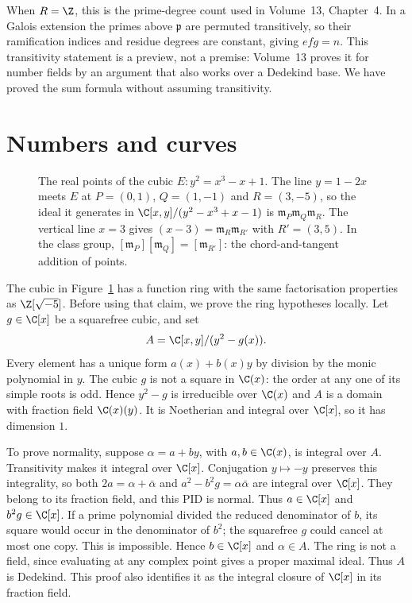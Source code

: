 When $R=\Z$, this is the prime-degree count used in Volume~13, Chapter~4. In a Galois extension the primes above $\mathfrak p$ are permuted transitively, so their ramification indices and residue degrees are constant, giving $efg=n$. This transitivity statement is a preview, not a premise: Volume~13 proves it for number fields by an argument that also works over a Dedekind base. We have proved the sum formula without assuming transitivity.

\section{Numbers and curves}

\begin{figure}[ht]
\centering
{}
\caption{The real points of the cubic $E\colon y^2=x^3-x+1$. The line $y=1-2x$ meets $E$ at $P=(0,1)$, $Q=(1,-1)$ and $R=(3,-5)$, so the ideal it generates in $\C[x,y]/(y^2-x^3+x-1)$ is $\mathfrak m_P\mathfrak m_Q\mathfrak m_R$.
The vertical line $x=3$ gives $(x-3)=\mathfrak m_R\mathfrak m_{R'}$ with $R'=(3,5)$. In the class group, $[\mathfrak m_P][\mathfrak m_Q]=[\mathfrak m_{R'}]$: the chord-and-tangent addition of points.}
\label{fig:cubicclass}
\end{figure}

The cubic in Figure~\ref{fig:cubicclass} has a function ring with the same factorisation properties as $\Z[\sqrt{-5}]$. Before using that claim, we prove the ring hypotheses locally. Let $g\in\C[x]$ be a squarefree cubic, and set
\[
 A=\C[x,y]/(y^2-g(x)).
\]
Every element has a unique form $a(x)+b(x)y$ by division by the monic polynomial in $y$. The cubic $g$ is not a square in $\C(x)$: the order at any one of its simple roots is odd. Hence $y^2-g$ is irreducible over $\C(x)$ and $A$ is a domain with fraction field $\C(x)(y)$. It is Noetherian and integral over $\C[x]$, so it has dimension $1$.

To prove normality, suppose $\alpha=a+by$, with $a,b\in\C(x)$, is integral over $A$. Transitivity makes it integral over $\C[x]$. Conjugation $y\mapsto-y$ preserves this integrality, so both $2a=\alpha+\bar\alpha$ and $a^2-b^2g=\alpha\bar\alpha$ are integral over $\C[x]$. They belong to its fraction field, and this PID is normal. Thus $a\in\C[x]$ and $b^2g\in\C[x]$. If a prime polynomial divided the reduced denominator of $b$, its square would occur in the denominator of $b^2$; the squarefree $g$ could cancel at most one copy. This is impossible. Hence $b\in\C[x]$ and $\alpha\in A$. The ring is not a field, since evaluating at any complex point gives a proper maximal ideal. Thus $A$ is Dedekind. This proof also identifies it as the integral closure of $\C[x]$ in its fraction field.

